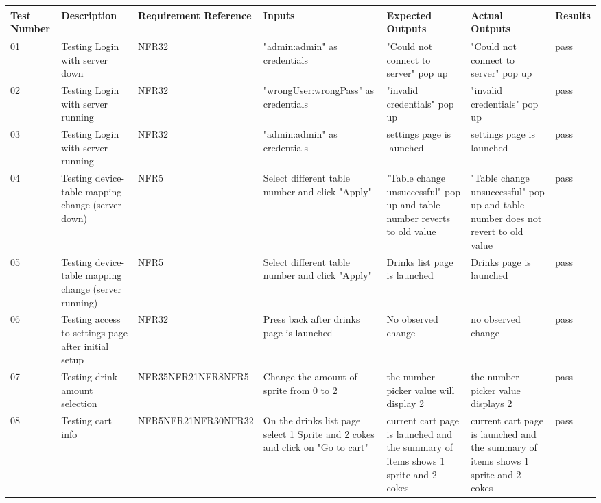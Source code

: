 \documentclass [10pt]{article}
\begin{document}
	\begin{longtable}{| p{} | p{} | p{} | p{} | p{} | p{} | p{} |}\hline 
		\rowcolor{tableCell}\textbf{Test Number} & \textbf{Description} & \textbf{Requirement Reference} & \textbf{Inputs} & \textbf{Expected Outputs} & \textbf{Actual Outputs}& \textbf{Results} \\ \hline

01 &  Testing Login with server down &  NFR32 &  "admin:admin" as credentials &  "Could not connect to server" pop up &  "Could not connect to server" pop up &  pass
\\ \hline  
02 &  Testing Login with server running &  NFR32 &  "wrongUser:wrongPass" as credentials &  "invalid credentials" pop up &  "invalid credentials" pop up &  pass
\\ \hline  
03 &  Testing Login with server running &  NFR32 &  "admin:admin" as credentials &  settings page is launched &  settings page is launched &  pass
\\ \hline  
04 &  Testing device-table mapping change (server down) &  NFR5 &  Select different table number and click "Apply" &  "Table change unsuccessful" pop up and table number reverts to old value &  "Table change unsuccessful" pop up and table number does not revert to old value &  pass
\\ \hline  
05 &  Testing device-table mapping change (server running) &  NFR5 &  Select different table number and click "Apply" &  Drinks list page is launched &  Drinks page is launched &  pass
\\ \hline  
06 &  Testing access to settings page after initial setup &  NFR32 &  Press back after drinks page is launched &  No observed change &  no observed change &  pass
\\ \hline  
07 &  Testing drink amount selection &  NFR35\newline NFR21\newline NFR8\newline NFR5 &  Change the amount of sprite from 0 to 2 &  the number picker value will display 2 &  the number picker value displays 2 &  pass
\\ \hline  
08 &  Testing cart info &  NFR5\newline NFR21\newline NFR30\newline NFR32 &  On the drinks list page select 1 Sprite and 2 cokes and click on "Go to cart" &  current cart page is launched and the summary of items shows 1 sprite and 2 cokes &  current cart page is launched and the summary of items shows 1 sprite and 2 cokes &  pass\\ \hline  

\end{longtable}
\end{document}
